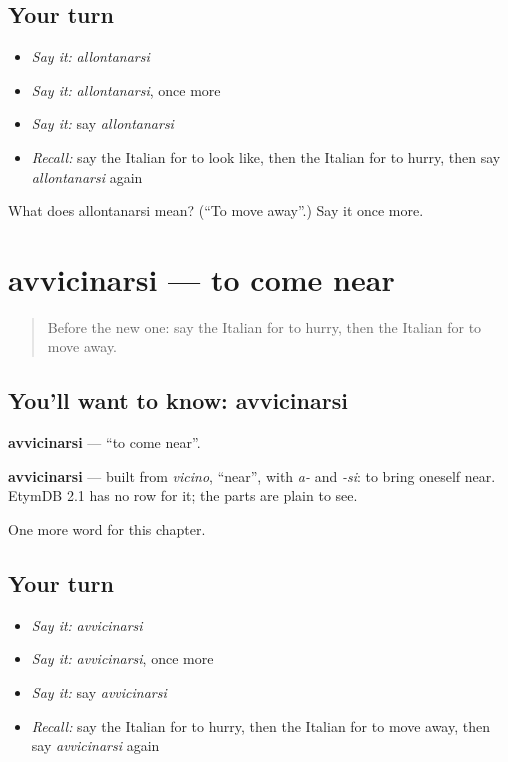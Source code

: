\subsection*{Your turn}
\begin{itemize}
\raggedright
  \item \emph{Say it:} \emph{allontanarsi}
  \item \emph{Say it:} \emph{allontanarsi}, once more
  \item \emph{Say it:} say \emph{allontanarsi}
  \item \emph{Recall:} say the Italian for to look like, then the Italian for to hurry, then say \emph{allontanarsi} again
\end{itemize}

\begin{tcolorbox}[breakable,colback=teal!4,colframe=teal!35!black,title={Before you move on}]
What does allontanarsi mean? (\textquotedblleft{}To move away\textquotedblright{}.) Say it once more.
\end{tcolorbox}
\section[avvicinarsi]{avvicinarsi — to come near}

\label{lesson:IT-C212-avvicinarsi}



\begin{quote}
Before the new one: say the Italian for to hurry, then the Italian for to move away.
\end{quote}

\subsection*{You'll want to know: avvicinarsi}
\textbf{avvicinarsi} — \textquotedblleft{}to come near\textquotedblright{}.

\begin{cousinweb}
\textbf{avvicinarsi} — built from \emph{vicino}, \textquotedblleft{}near\textquotedblright{}, with \emph{a-} and \emph{-si}: to bring oneself near. EtymDB 2.1 has no row for it; the parts are plain to see.
\end{cousinweb}

\begin{grammarlens}[title={What you've built}]
One more word for this chapter.
\end{grammarlens}

\subsection*{Your turn}
\begin{itemize}
\raggedright
  \item \emph{Say it:} \emph{avvicinarsi}
  \item \emph{Say it:} \emph{avvicinarsi}, once more
  \item \emph{Say it:} say \emph{avvicinarsi}
  \item \emph{Recall:} say the Italian for to hurry, then the Italian for to move away, then say \emph{avvicinarsi} again
\end{itemize}

